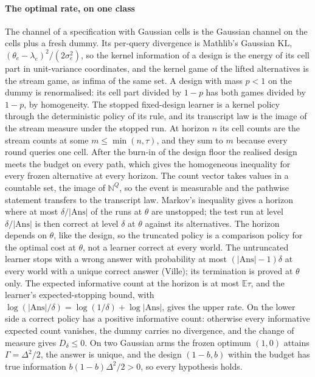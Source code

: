 \paragraph{The optimal rate, on one class} The channel of a specification with Gaussian cells is
the Gaussian channel on the cells plus a fresh dummy. Its per-query divergence is Mathlib's
Gaussian $\mathrm{KL}$, $(\theta_e-\lambda_e)^2/(2\sigma_e^2)$, so the kernel information of a
design is the energy of its cell part in unit-variance coordinates, and the kernel game of the
lifted alternatives is the stream game, as infima of the same set. A design with mass $p<1$ on
the dummy is renormalised: its cell part divided by $1-p$ has both games divided by $1-p$, by
homogeneity. The stopped fixed-design learner is a kernel policy through the deterministic
policy of its rule, and its transcript law is the image of the stream measure under the stopped
run. At horizon $n$ its cell counts are the stream counts at some $m\le\min(n,\tau)$, and they
sum to $m$ because every round queries one cell. After the burn-in of the design floor the
realised design meets the budget on every path, which gives the homogeneous inequality for every
frozen alternative at every horizon. The count vector takes values in a countable set, the image
of $\mathbb N^{Q}$, so the event is measurable and the pathwise statement transfers to the
transcript law. Markov's inequality gives a horizon where at most $\delta/|\mathrm{Ans}|$ of the
runs at $\theta$ are unstopped; the test run at level $\delta/|\mathrm{Ans}|$ is then correct at
level $\delta$ at $\theta$ against its alternatives. The horizon depends on $\theta$, like the
design, so the truncated policy is a comparison policy for the optimal cost at $\theta$, not a
learner correct at every world. The untruncated learner stops with a wrong answer with
probability at most $(|\mathrm{Ans}|-1)\delta$ at every world with a unique correct answer
(Ville); its termination is proved at $\theta$ only. The expected informative count at the horizon is at most $\mathbb E\tau$, and the
learner's expected-stopping bound, with $\log(|\mathrm{Ans}|/\delta)=\log(1/\delta)+\log|\mathrm{Ans}|$,
gives the upper rate. On the lower side a correct policy has a positive informative count:
otherwise every informative expected count vanishes, the dummy carries no divergence, and the
change of measure gives $D_\delta\le0$. On two Gaussian arms the frozen optimum $(1,0)$ attains
$\Gamma=\Delta^2/2$, the answer is unique, and the design $(1-b,b)$ within the budget has true
information $b(1-b)\Delta^2/2>0$, so every hypothesis holds.

